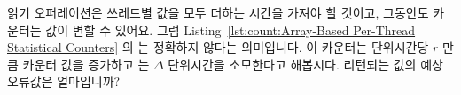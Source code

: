 \QuickQuiz{}
	읽기 오퍼레이션은 쓰레드별 값을 모두 더하는 시간을 가져야 할 것이고,
	그동안도 카운터는 값이 변할 수 있어요.
	그럼 Listing~\ref{lst:count:Array-Based Per-Thread Statistical Counters}
	의   는 정확하지 않다는 의미입니다.
	이 카운터는 단위시간당 $r$ 만큼 카운터 값을 증가하고 
	는 $\Delta$ 단위시간을 소모한다고 해봅시다.
	리턴되는 값의 예상 오류값은 얼마입니까?

